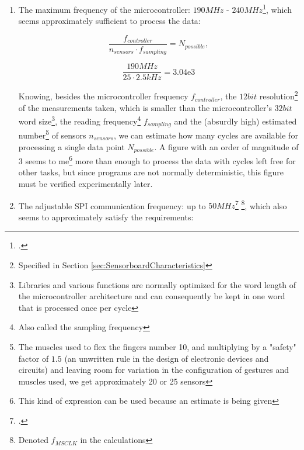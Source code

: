 \documentclass[a4paper, 10pt, final]{article} %
\begin{document}
    \begin{enumerate}[label=\emph{(\arabic*)}]
        \item The maximum frequency of the microcontroller: $190MHz$ - $240MHz$\footcite[Section 1.4.1]{ESP32:Datasheet}, which seems approximately sufficient to process the data:
            \begin{figure}[H]
                \centering
                \begin{minipage}[b]{.35\linewidth}
                    \centering
                    \[
                        \frac{f_{controller}}{n_{sensors} \cdot f_{sampling}} = N_{possible} \mathrm{,}
                    \]
                \end{minipage}
                \begin{minipage}[b]{.35\linewidth}
                    \centering
                    \[
                        \frac{190MHz}{25 \cdot 2.5kHz} = 3.04\mathrm{e}3
                    \]
                \end{minipage}
            \end{figure}
            \noindent Knowing, besides the microcontroller frequency $f_{controller}$, the $12bit$ resolution\footnote{Specified in Section \ref{sec:SensorboardCharacteristics}} of the measurements taken, which is smaller than the microcontroller's $32bit$ word size\footnote{Libraries and various functions are normally optimized for the word length of the microcontroller architecture and can consequently be kept in one word that is processed once per cycle}, the reading frequency\footnote{Also called the sampling frequency} $f_{sampling}$ and the (absurdly high) estimated number\footnote{The muscles used to flex the fingers number 10, and multiplying by a "safety" factor of $1.5$ (an unwritten rule in the design of electronic devices and circuits) and leaving room for variation in the configuration of gestures and muscles used, we get approximately 20 or 25 sensors} of sensors $n_{sensors}$, we can estimate how many cycles are available for processing a single data point $N_{possible}$.
            A figure with an order of magnitude of $3$ seems to me\footnote{This kind of expression can be used because an estimate is being given} more than enough to process the data with cycles left free for other tasks, but since programs are not normally deterministic, this figure must be verified experimentally later.
            \label{est:ControllerSpeed}
        \item The adjustable SPI communication frequency: up to $50MHz$\footcite[Section 4.1.9]{ESP32:Datasheet} \footnote{Denoted $f_{MSCLK}$ in the calculations}, which also seems to approximately satisfy the requirements:

\end{enumerate}
\end{document}
